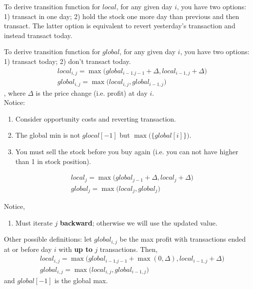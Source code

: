To derive transition function for $local$, for any given day $i$, you have two options: 1) transact in one day; 2) hold the stock one more day than previous and then transact. The latter option is equivalent to revert yesterday's transaction and instead transact today. 

To derive transition function for $global$, for any given day $i$, you have two options: 1) transact today; 2) don't transact today. 
\begin{eqnarray*}
&& local_{i,j} = \max\Big(global_{i-1.j-1}+\Delta, local_{i-1,j}+\Delta\Big) \nonumber \\
&& global_{i,j} = \max\Big(local_{i, j}, global_{i-1,j}\Big)
\end{eqnarray*}
, where $\Delta$ is the price change (i.e. profit) at day $i$.\\
Notice:
\begin{enumerate}
\item Consider opportunity costs and reverting transaction.
\item The global min is not $glocal[-1]$ but $\max\big(\{global[i]\}\big)$.
\item You must sell the stock before you buy again (i.e. you can not have higher than 1 in stock position). 
\end{enumerate}

\begin{eqnarray*}
&& local_{j} = \max\Big(global_{j-1} + \Delta, local_{j}+\Delta\Big)
\nonumber \\
&& global_{j} = \max\Big(local_{j}, global_{j}\Big)
\end{eqnarray*}

Notice,
\begin{enumerate}
\item Must iterate $j$ \textbf{backward}; otherwise we will use the updated value. 
\end{enumerate}

Other possible definitions: let $global_{i, j}$ be the max profit
with transactions ended at or before day $i$ with \textbf{up to} $j$ transactions. Then, 
\begin{eqnarray*}
&& local_{i,j} = \max\Big(global_{i-1.j-1} + \max(0, \Delta), local_{i-1,j}+\Delta\Big)
\nonumber \\
&& global_{i,j} = \max\Big(local_{i, j}, global_{i-1,j}\Big)
\end{eqnarray*}
and $global[-1]$ is the global max. 

